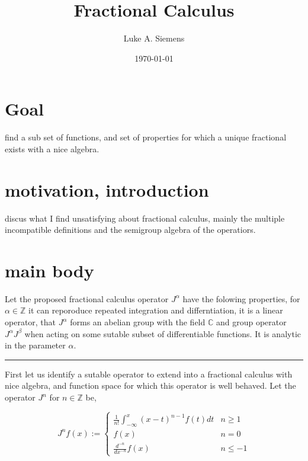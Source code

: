 \documentclass[%
 preprint,
 amsmath, amssymb, aps, pra, 10pt
]{revtex4-2}
\begin{document}
\title{Fractional Calculus}%

\author{Luke A. Siemens}
\noaffiliation

\date{\today}

\maketitle

\section{Goal}
find a sub set of functions, and set of properties for which a unique fractional exists with a nice algebra.

\section{motivation, introduction}
discus what I find unsatisfying about fractional calculus, mainly  the multiple incompatible definitions and the semigroup algebra of the operatiors.

\section{main body}

Let the proposed fractional calculus operator $J^\alpha$ have the folowing properties, for $\alpha \in \mathbb{Z}$ it can reporoduce repeated integration and differntiation, it is a linear operator, that $J^\alpha$ forms an abelian group with the field $\mathbb{C}$ and group operator $J^\alpha J^\beta$ when acting on some sutable subset of differentiable functions. It is analytic in the parameter $\alpha$.

\noindent\rule{\textwidth}{1pt}


First let us identify a sutable operator to extend into a fractional calculus with nice algebra, and function space for which this operator is well behaved. Let the operator $J^n$ for $n \in \mathbb{Z}$ be,

\begin{equation}
J^n f(x) := \begin{cases} \frac{1}{n!}\int_{-\infty}^x (x - t)^{n - 1}f(t)dt & n \geq 1 \\ f(x) & n = 0 \\ \frac{d^{-n}}{dx^{-n}}f(x) & n \leq -1 \end{cases}
\label{integer_calculus}
\end{equation}
\end{document}
